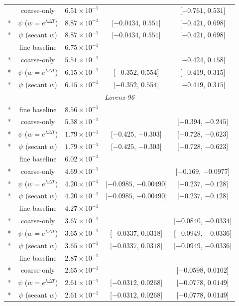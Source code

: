 \begin{longtable}{@{\extracolsep{\fill}}ccccc@{}}
 & coarse-only & $6.51\times 10^{-1}$ &  & [$-0.761$, $0.531$]\\*
 & $\psi$ ($w=e^{\lambda\Delta T}$) & $8.87\times 10^{-1}$ & [$-0.0434$, $0.551$] & [$-0.421$, $0.698$]\\*
 & $\psi$ (secant $w$) & $8.87\times 10^{-1}$ & [$-0.0434$, $0.551$] & [$-0.421$, $0.698$]\\
\addlinespace[3pt]
\multirow{4}{*}{$128$} & fine baseline & $6.75\times 10^{-1}$ &  & \\*
 & coarse-only & $5.51\times 10^{-1}$ &  & [$-0.424$, $0.158$]\\*
 & $\psi$ ($w=e^{\lambda\Delta T}$) & $6.15\times 10^{-1}$ & [$-0.352$, $0.554$] & [$-0.419$, $0.315$]\\*
 & $\psi$ (secant $w$) & $6.15\times 10^{-1}$ & [$-0.352$, $0.554$] & [$-0.419$, $0.315$]\\
\midrule
\multicolumn{5}{c}{\textit{Lorenz-96}}\\*
\multirow{4}{*}{$16$} & fine baseline & $8.56\times 10^{-1}$ &  & \\*
 & coarse-only & $5.38\times 10^{-1}$ &  & [$-0.394$, $-0.245$]\\*
 & $\psi$ ($w=e^{\lambda\Delta T}$) & $1.79\times 10^{-1}$ & [$-0.425$, $-0.303$] & [$-0.728$, $-0.623$]\\*
 & $\psi$ (secant $w$) & $1.79\times 10^{-1}$ & [$-0.425$, $-0.303$] & [$-0.728$, $-0.623$]\\
\addlinespace[3pt]
\multirow{4}{*}{$32$} & fine baseline & $6.02\times 10^{-1}$ &  & \\*
 & coarse-only & $4.69\times 10^{-1}$ &  & [$-0.169$, $-0.0977$]\\*
 & $\psi$ ($w=e^{\lambda\Delta T}$) & $4.20\times 10^{-1}$ & [$-0.0985$, $-0.00490$] & [$-0.237$, $-0.128$]\\*
 & $\psi$ (secant $w$) & $4.20\times 10^{-1}$ & [$-0.0985$, $-0.00490$] & [$-0.237$, $-0.128$]\\
\addlinespace[3pt]
\multirow{4}{*}{$64$} & fine baseline & $4.27\times 10^{-1}$ &  & \\*
 & coarse-only & $3.67\times 10^{-1}$ &  & [$-0.0840$, $-0.0334$]\\*
 & $\psi$ ($w=e^{\lambda\Delta T}$) & $3.65\times 10^{-1}$ & [$-0.0337$, $0.0318$] & [$-0.0949$, $-0.0336$]\\*
 & $\psi$ (secant $w$) & $3.65\times 10^{-1}$ & [$-0.0337$, $0.0318$] & [$-0.0949$, $-0.0336$]\\
\addlinespace[3pt]
\multirow{4}{*}{$128$} & fine baseline & $2.87\times 10^{-1}$ &  & \\*
 & coarse-only & $2.65\times 10^{-1}$ &  & [$-0.0598$, $0.0102$]\\*
 & $\psi$ ($w=e^{\lambda\Delta T}$) & $2.61\times 10^{-1}$ & [$-0.0312$, $0.0268$] & [$-0.0778$, $0.0149$]\\*
 & $\psi$ (secant $w$) & $2.61\times 10^{-1}$ & [$-0.0312$, $0.0268$] & [$-0.0778$, $0.0149$]\\
\end{longtable}\endgroup
